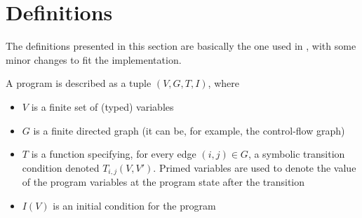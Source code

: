 
\section{Definitions}
\label{sec:definition}

The definitions presented in this section are basically the one used in \cite{zucknamjoshi}, with some minor changes to fit the implementation.


\begin{fdefinition}[Program]
\label{def:program}
A program is described as a tuple $(V, G, T, I)$, where
\begin{itemize}
  \item $V$ is a finite set of (typed) variables
  \item $G$ is a finite directed graph (it can be, for example, the control-flow graph)
  \item $T$ is a function specifying, for every edge $(i, j) \in G$, a symbolic transition condition denoted $T_{i,j}(V, V')$. Primed variables are used to denote the value of the program variables at the program state after the transition
  \item $I(V)$ is an initial condition for the program
\end{itemize}
\end{fdefinition}

